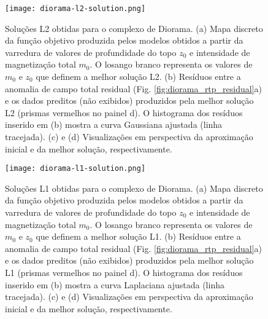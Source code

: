\pagebreak
\begin{figure}[!htb]
	\texttt{[image: diorama-l2-solution.png]}
	\caption{Soluções L2 obtidas para o complexo de Diorama. 
		(a) Mapa discreto da função objetivo produzida pelos modelos obtidos a partir da varredura de valores de profundidade do topo $z_{0}$ e intensidade de magnetização total $m_{0}$. 
		O losango branco representa os valores de $m_{0}$ e $z_{0}$ que definem a melhor solução L2.
		(b) Resíduos entre a anomalia de campo total residual (Fig. \ref{fig:diorama_rtp_residual}a) e os dados preditos (não exibidos) produzidos pela melhor solução L2 (prismas vermelhos no painel d). 
		O histograma dos resíduos inserido em (b) mostra a curva
		Gaussiana ajustada (linha tracejada). 
		(c) e (d) Visualizações em perspectiva da aproximação inicial e da melhor solução, respectivamente.
	}
	\label{fig:diorama_l2_result}
\end{figure}

\pagebreak
\begin{figure}[!htb]
	\texttt{[image: diorama-l1-solution.png]}
	\caption{Soluções L1 obtidas para o complexo de Diorama. 
		(a) Mapa discreto da função objetivo produzida pelos modelos obtidos a partir da varredura de valores de profundidade do topo $z_{0}$ e intensidade de magnetização total $m_{0}$. 
		O losango branco representa os valores de $m_{0}$ e $z_{0}$ que definem a melhor solução L1.
		(b) Resíduos entre a anomalia de campo total residual (Fig. \ref{fig:diorama_rtp_residual}a) e os dados preditos (não exibidos) produzidos pela melhor solução L1 (prismas vermelhos no painel d). 
		O histograma dos resíduos inserido em (b) mostra a curva
		Laplaciana ajustada (linha tracejada). 
		(c) e (d) Visualizações em perspectiva da aproximação inicial e da melhor solução, respectivamente.
	}
	\label{fig:diorama_l1_result}
\end{figure}